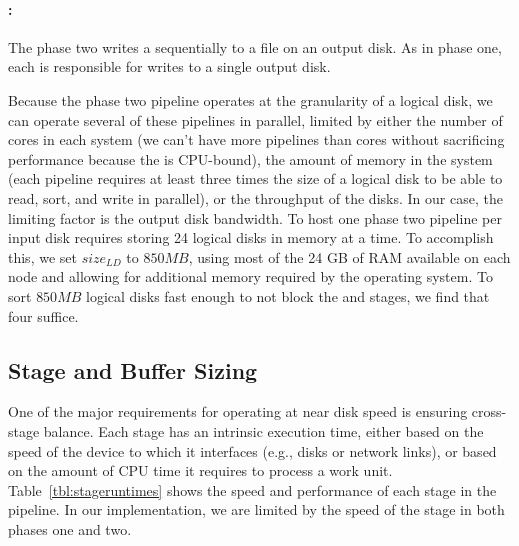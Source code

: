 \paragraph{\writer:}  The phase two \writer writes a \phasetwobuffer
sequentially to a file on an output disk. As in phase one, each \writer is
responsible for writes to a single output disk.

Because the phase two pipeline operates at the granularity of a logical disk,
we can operate several of these pipelines in parallel, limited by either the
number of cores in each system (we can't have more pipelines than cores without
sacrificing performance because the \sorter is CPU-bound), the amount of
memory in the system (each pipeline requires at least three times the size of a
logical disk to be able to read, sort, and write in parallel), or the
throughput of the disks.  In our case, the limiting factor is the
output disk bandwidth.  To host one phase two pipeline per input
disk requires storing 24 logical disks in memory at a time.  To
accomplish this, we set $size_{LD}$ to $850 MB$, using most of the 24 GB of RAM
available on each node and allowing for additional memory required by the
operating system.  To sort $850 MB$ logical disks fast enough to not block the
\reader and \writer stages, we find that four \sorters suffice.

\subsection{Stage and Buffer Sizing}

One of the major requirements for operating \tritonsort at near disk speed is
ensuring cross-stage balance.  Each stage has an intrinsic execution time,
either based on the speed of the device to which it interfaces (e.g., disks or
network links), or based on the amount of CPU time it requires to process a
work unit.  Table~\ref{tbl:stageruntimes} shows the speed and performance of
each stage in the pipeline.  In our implementation, we are limited by the speed
of the \writer stage in both phases one and two.

